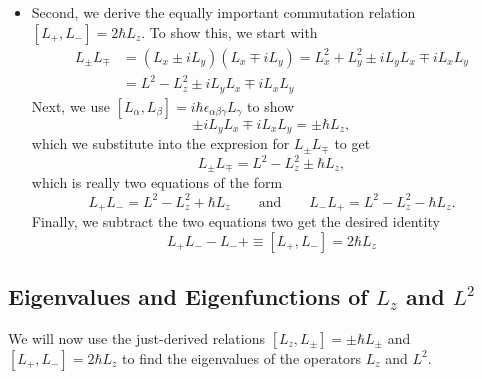 \documentclass[11pt, a4paper]{article}
\begin{document}
\begin{itemize}
	\item Second, we derive the equally important commutation relation $ [L_{+}, L_{-}] = 2\hbar L_{z} $. To show this, we start with
	\begin{align*}
 		L_{\pm}L_{\mp} &= (L_{x} \pm i L_{y})(L_{x} \mp i L_{y}) = L_{x}^{2} + L_{y}^{2} \pm i L_{y}L_{x} \mp i L_{x}L_{y} \\
 		& = L^{2} - L_{z}^{2} \pm i L_{y}L_{x} \mp i L_{x}L_{y} 
	\end{align*}
	Next, we use $ [L_{\alpha}, L_{\beta}] = i \hbar \epsilon_{\alpha \beta \gamma} L_{\gamma}  $ to show 
	\begin{equation*}
		\pm i L_{y}L_{x} \mp i L_{x}L_{y} = \pm \hbar L_{z},
	\end{equation*}
    which we substitute into the expresion for $ L_{\pm}L_{\mp} $ to get
    \begin{equation*}
        L_{\pm}L_{\mp} = L^{2} - L_{z}^{2} \pm \hbar L_{z},
    \end{equation*}
    which is really two equations of the form
    \begin{equation*}
        L_{+} L_{-} = L^{2} - L_{z}^{2} + \hbar L_{z} \qquad \text{and} \qquad L_{-} L_{+} = L^{2} - L_{z}^{2} - \hbar L_{z}.
    \end{equation*}
    Finally, we subtract the two equations two get the desired identity
    \begin{equation*}
        L_{+}L_{-} - L_{-}{+}  \equiv [L_{+}, L_{-}] = 2 \hbar L_{z}
    \end{equation*}
	
\end{itemize}

\subsection{Eigenvalues and Eigenfunctions of $ L_{z} $ and $ L^{2} $}
We will now use the just-derived relations $ [L_{z}, L_{\pm}] = \pm \hbar L_{\pm} $ and $ [L_{+}, L_{-}] = 2 \hbar L_{z} $ to find the eigenvalues of the operators $ L_{z} $ and $ L^{2} $. 
\end{document}
